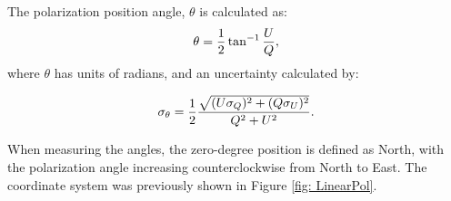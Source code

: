 The polarization position angle, $\theta$ is calculated as: 
\begin{equation}
\theta = \frac{1}{2} \tan ^{-1} \frac{U}{Q},
    \label{eq: PA}
\end{equation}
\noindent where $\theta$ has units of radians, and an uncertainty calculated by:

\begin{equation}
    \sigma_\theta = \frac{1}{2} 
    \frac{\sqrt{(U\sigma_Q)^2 + (Q\sigma_U)^2}}{Q^2 + U^2}.
    \label{eq: PA_error}
\end{equation}
 

\noindent When measuring the angles, the zero-degree position is defined as North, with the polarization angle increasing counterclockwise from North to East. The coordinate system was previously shown in Figure \ref{fig: LinearPol}. 










